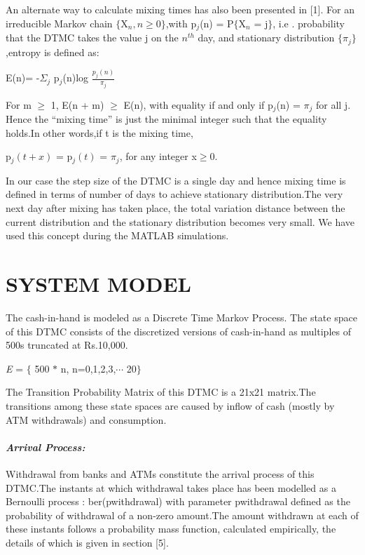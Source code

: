 \documentclass[12pt]{article}
\begin{document}
\begin{itemize}
An alternate way to calculate mixing times has also been presented in [1].
For an irreducible Markov chain $\lbrace$X$_{n},n\geq0 \rbrace$,with p$_{j}$(n) = P$\lbrace$X$_{n}$ = j$\rbrace$, i.e . probability that the DTMC  takes the value j on the $n^{th}$ day, and stationary distribution $\lbrace\pi_{j}\rbrace$,entropy is defined as:
\begin{center}
E(n)= -$\Sigma_{j}$ p$_{j}$(n)log $\frac{p_{j}(n)}{\pi_{j}}$
\end{center}
For m $\geq$ 1, E(n + m) $\geq$ E(n), with equality if and only if p$_{j}$(n) = $\pi_{j}$ for all
j. Hence the “mixing time” is just the minimal integer such that the equality holds.In other words,if t is the mixing time,
\begin{center}
p$_{j}(t+x)$ = p$_{j}(t)$ = $\pi_{j}$, for any integer x$\geq$0.
\end{center}
In our case the step size of the DTMC is a single day and hence mixing time is defined in terms of number of days to achieve stationary distribution.The very next day after mixing has taken place, the total variation distance between the current distribution and the stationary distribution becomes very small. We have used this concept during the MATLAB simulations.
\end{itemize}

\section{SYSTEM MODEL}
The cash-in-hand is modeled as a Discrete Time Markov Process. The state space of this DTMC consists of the discretized versions of cash-in-hand as multiples of 500s truncated at Rs.10,000.
\begin{center}
\textit{E} = $\lbrace$ 500 $*$ n, n=0,1,2,3,$\cdots$ 20$\rbrace$
\end{center}
The Transition Probability Matrix of this DTMC is a 21x21 matrix.The transitions among these state spaces are caused by inflow of cash (mostly by ATM withdrawals) and consumption.\\
\paragraph{\textit{Arrival Process:}}
Withdrawal from banks and ATMs constitute the arrival process of this DTMC.The instants at which withdrawal takes place has been modelled as a Bernoulli process : ber(pwithdrawal) with parameter pwithdrawal defined as the probability of withdrawal of a non-zero amount.The amount withdrawn at each of these instants follows a probability mass function, calculated empirically, the details of which is given in section [5].
\end{document}
